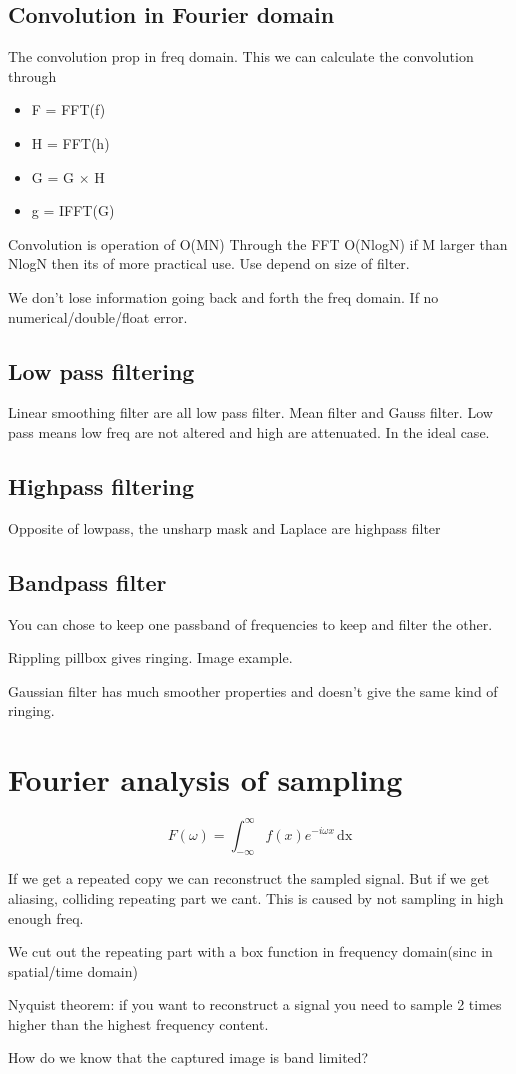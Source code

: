 \subsection*{Convolution in Fourier domain}
The convolution prop in freq domain. This we can calculate the convolution through

\begin{itemize}
	\item F = FFT(f)
	\item H = FFT(h)
	\item G = G $\times$ H
	\item g = IFFT(G)
\end{itemize}

Convolution is operation of O(MN) Through the FFT O(NlogN) if M larger than NlogN then its of more practical use. Use depend on size of filter. 

We don't lose information going back and forth the freq domain. If no numerical/double/float error. 

\subsection*{Low pass filtering}
Linear smoothing filter are all low pass filter. Mean filter and Gauss filter. Low pass means low freq are not altered and high are attenuated. In the ideal case. 

\subsection*{Highpass filtering}
Opposite of lowpass, the unsharp mask and Laplace are highpass filter

\subsection*{Bandpass filter}
You can chose to keep one passband of frequencies to keep and filter the other.

Rippling pillbox gives ringing. Image example.

Gaussian filter has much smoother properties and doesn't give the same kind of ringing. 

\section{Fourier analysis of sampling}
\begin{equation}
F(\omega) = \int_{-\infty}^{\infty} f(x) e^{-i\omega x}\,\text{dx}
\end{equation} %

If we get a repeated copy we can reconstruct the sampled  signal. But if we get aliasing, colliding repeating part we cant. This is caused by not sampling in high enough freq. 

We cut out the repeating part with a box function in frequency domain(sinc in spatial/time domain) 

Nyquist theorem:  if you want to reconstruct a signal you need to sample 2 times higher than the highest frequency content. 

How do we know that the captured image is band limited?

 



